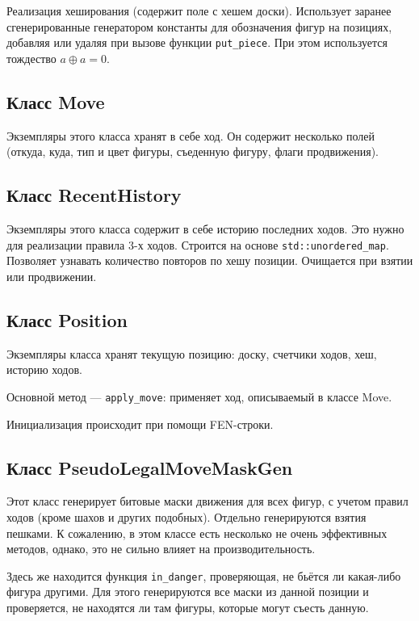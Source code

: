 Реализация хеширования (содержит поле с хешем доски). Использует заранее сгенерированные генератором константы для обозначения фигур на позициях, добавляя или удаляя при вызове функции \texttt{put\_piece}. При этом используется тождество $a\oplus a = 0$.

\subsection*{Класс Move}

Экземпляры этого класса хранят в себе ход. Он содержит несколько полей (откуда, куда, тип и цвет фигуры, съеденную фигуру, флаги продвижения). 

\subsection*{Класс RecentHistory}

Экземпляры этого класса содержит в себе историю последних ходов. Это нужно для реализации правила 3-х ходов. Строится на основе \texttt{std::unordered\_map}. Позволяет узнавать количество повторов по хешу позиции. Очищается при взятии или продвижении.

\subsection*{Класс Position}

Экземпляры класса хранят текущую позицию: доску, счетчики ходов, хеш, историю ходов. 

Основной метод --- \texttt{apply\_move}: применяет ход, описываемый в классе Move.

Инициализация происходит при помощи FEN-строки.

\subsection*{Класс PseudoLegalMoveMaskGen}

Этот класс генерирует битовые маски движения для всех фигур, с учетом правил ходов (кроме шахов и других подобных). Отдельно генерируются взятия пешками. К сожалению, в этом классе есть несколько не очень эффективных методов, однако, это не сильно влияет на производительность.

Здесь же находится функция \texttt{in\_danger}, проверяющая, не бьётся ли какая-либо фигура другими. Для этого генерируются все маски из данной позиции и проверяется, не находятся ли там фигуры, которые могут съесть данную.


